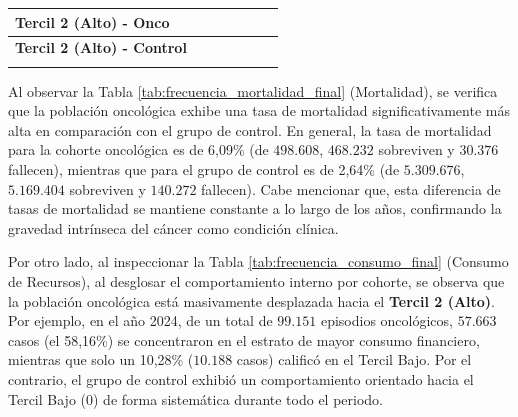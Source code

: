 \begin{table}[htbp]
\begin{tabular}{|l|c|c|c|c|c|c|}
\parbox[t]{3.0cm}{\textbf{Tercil 2 (Alto) - Onco}} & \parbox[t]{1.6cm}{} & \parbox[t]{1.6cm}{} & \parbox[t]{1.6cm}{} & \parbox[t]{1.6cm}{} & \parbox[t]{1.6cm}{} & \parbox[t]{1.6cm}{} \\ \hline
\parbox[t]{3.0cm}{\textbf{Tercil 2 (Alto) - Control}} & \parbox[t]{1.6cm}{} & \parbox[t]{1.6cm}{} & \parbox[t]{1.6cm}{} & \parbox[t]{1.6cm}{} & \parbox[t]{1.6cm}{} & \parbox[t]{1.6cm}{} \\ \hline
{}\parbox[t]{3.0cm}{\textbf{Tercil 2 (Alto) - Pob. Total}} & \parbox[t]{1.6cm}{} & \parbox[t]{1.6cm}{} & \parbox[t]{1.6cm}{} & \parbox[t]{1.6cm}{} & \parbox[t]{1.6cm}{} & \parbox[t]{1.6cm}{} \\ \hline
\end{tabular}
\end{table}

Al observar la Tabla \ref{tab:frecuencia_mortalidad_final} (Mortalidad), se verifica que la población oncológica exhibe una tasa de mortalidad significativamente más alta en comparación con el grupo de control. En general, la tasa de mortalidad para la cohorte oncológica es de 6,09\% (de $498.608$, $468.232$ sobreviven y $30.376$ fallecen), mientras que para el grupo de control es de 2,64\% (de $5.309.676$, $5.169.404$ sobreviven y $140.272$ fallecen). Cabe mencionar que, esta diferencia de tasas de mortalidad se mantiene constante a lo largo de los años, confirmando la gravedad intrínseca del cáncer como condición clínica.

Por otro lado, al inspeccionar la Tabla \ref{tab:frecuencia_consumo_final} (Consumo de Recursos), al desglosar el comportamiento interno por cohorte, se observa que la población oncológica está masivamente desplazada hacia el \textbf{Tercil 2 (Alto)}. Por ejemplo, en el año 2024, de un total de $99.151$ episodios oncológicos, $57.663$ casos (el 58,16\%) se concentraron en el estrato de mayor consumo financiero, mientras que solo un 10,28\% ($10.188$ casos) calificó en el Tercil Bajo. Por el contrario, el grupo de control exhibió un comportamiento orientado hacia el Tercil Bajo (0) de forma sistemática durante todo el periodo.

